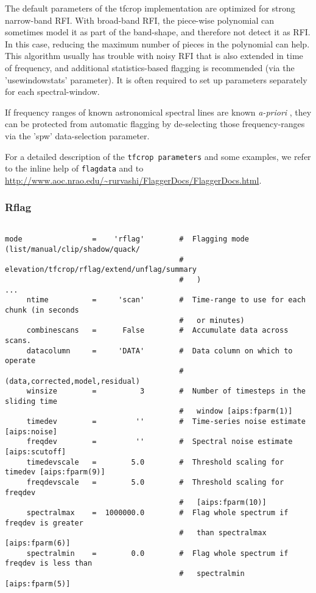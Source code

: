 The default parameters of the tfcrop implementation are optimized for
strong narrow-band RFI. With broad-band RFI, the piece-wise polynomial
can sometimes model it as part of the band-shape, and therefore not
detect it as RFI. In this case, reducing the maximum number of pieces
in the polynomial can help. This algorithm usually has trouble with
noisy RFI that is also extended in time of frequency, and additional
statistics-based flagging is recommended (via the 'usewindowstats'
parameter). It is often required to set up parameters separately for
each spectral-window.

If frequency ranges of known astronomical spectral lines are known {\it 
a-priori} , they can be protected from automatic flagging by
de-selecting those frequency-ranges via the 'spw' data-selection
parameter.


For a detailed description of the {\tt tfcrop parameters} and some
examples, we refer to the inline help of {\tt flagdata} and to
\url{http://www.aoc.nrao.edu/~rurvashi/FlaggerDocs/FlaggerDocs.html}.

\subsubsection{Rflag}
\label{section:edit.flagdata.mode.rflag}

\small
\begin{verbatim}

mode                =    'rflag'        #  Flagging mode (list/manual/clip/shadow/quack/
                                        #   elevation/tfcrop/rflag/extend/unflag/summary
                                        #   )
...
     ntime          =     'scan'        #  Time-range to use for each chunk (in seconds
                                        #   or minutes)
     combinescans   =      False        #  Accumulate data across scans.
     datacolumn     =     'DATA'        #  Data column on which to operate
                                        #   (data,corrected,model,residual)
     winsize        =          3        #  Number of timesteps in the sliding time
                                        #   window [aips:fparm(1)]
     timedev        =         ''        #  Time-series noise estimate [aips:noise]
     freqdev        =         ''        #  Spectral noise estimate [aips:scutoff]
     timedevscale   =        5.0        #  Threshold scaling for timedev [aips:fparm(9)]
     freqdevscale   =        5.0        #  Threshold scaling for freqdev
                                        #   [aips:fparm(10)]
     spectralmax    =  1000000.0        #  Flag whole spectrum if freqdev is greater
                                        #   than spectralmax [aips:fparm(6)]
     spectralmin    =        0.0        #  Flag whole spectrum if freqdev is less than
                                        #   spectralmin [aips:fparm(5)]
                                       
\end{verbatim}
\normalsize

